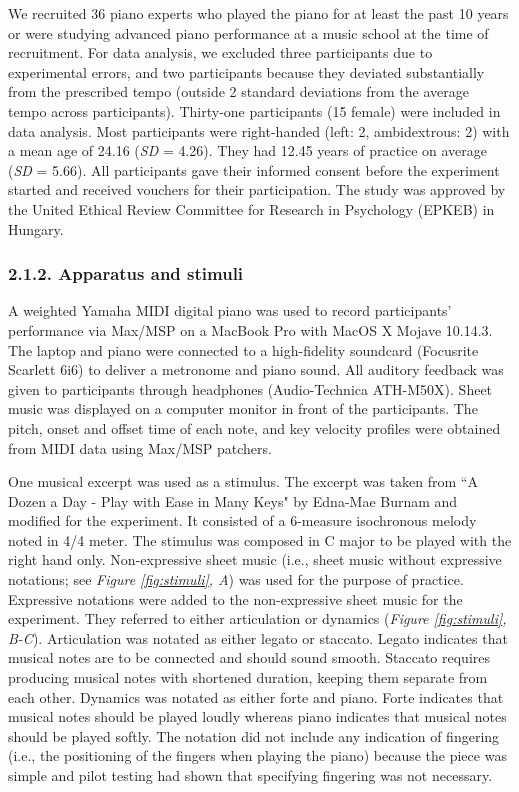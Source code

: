 \documentclass[
  english,
  man,floatsintext]{apa6}
\begin{document}
We recruited 36 piano experts who played the piano for at least the past 10 years or were studying advanced piano performance at a music school at the time of recruitment. For data analysis, we excluded three participants due to experimental errors, and two participants because they deviated substantially from the prescribed tempo (outside 2 standard deviations from the average tempo across participants). Thirty-one participants (15 female) were included in data analysis. Most participants were right-handed (left: 2, ambidextrous: 2) with a mean age of 24.16 (\emph{SD} = 4.26). They had 12.45 years of practice on average (\emph{SD} = 5.66). All participants gave their informed consent before the experiment started and received vouchers for their participation. The study was approved by the United Ethical Review Committee for Research in Psychology (EPKEB) in Hungary.

\hypertarget{apparatus-and-stimuli}{%
\subsubsection{2.1.2. Apparatus and stimuli}\label{apparatus-and-stimuli}}

A weighted Yamaha MIDI digital piano was used to record participants' performance via Max/MSP on a MacBook Pro with MacOS X Mojave 10.14.3. The laptop and piano were connected to a high-fidelity soundcard (Focusrite Scarlett 6i6) to deliver a metronome and piano sound. All auditory feedback was given to participants through headphones (Audio-Technica ATH-M50X). Sheet music was displayed on a computer monitor in front of the participants. The pitch, onset and offset time of each note, and key velocity profiles were obtained from MIDI data using Max/MSP patchers.

One musical excerpt was used as a stimulus. The excerpt was taken from ``A Dozen a Day - Play with Ease in Many Keys" by Edna-Mae Burnam and modified for the experiment. It consisted of a 6-measure isochronous melody noted in 4/4 meter. The stimulus was composed in C major to be played with the right hand only. Non-expressive sheet music (i.e., sheet music without expressive notations; see \emph{Figure \ref{fig:stimuli}, A}) was used for the purpose of practice. Expressive notations were added to the non-expressive sheet music for the experiment. They referred to either articulation or dynamics (\emph{Figure \ref{fig:stimuli}, B-C}). Articulation was notated as either legato or staccato. Legato indicates that musical notes are to be connected and should sound smooth. Staccato requires producing musical notes with shortened duration, keeping them separate from each other. Dynamics was notated as either forte and piano. Forte indicates that musical notes should be played loudly whereas piano indicates that musical notes should be played softly. The notation did not include any indication of fingering (i.e., the positioning of the fingers when playing the piano) because the piece was simple and pilot testing had shown that specifying fingering was not necessary.
\end{document}
